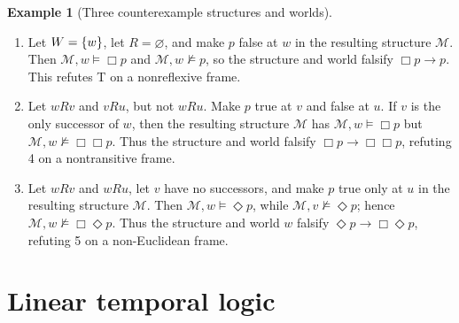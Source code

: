 \documentclass[11pt,oneside,openany]{book}
\theoremstyle{definition}
\newtheorem{example}[definition]{Example}
\theoremstyle{plain}
\theoremstyle{remark}
\DeclarePairedDelimiter{\set}{\lbrace}{\rbrace}
\newcommand{\entails}{\models}
\newcommand{\notentails}{\not\models}
\begin{document}
\begin{example}[Three counterexample structures and worlds]
\begin{enumerate}
  \item Let \(W=\set w\), let \(R=\varnothing\), and make \(p\) false at
        \(w\) in the resulting structure \(\mathcal M\).  Then
        \(\mathcal M,w\entails\Box p\) and
        \(\mathcal M,w\notentails p\), so the structure and world falsify
        \(\Box p\to p\).  This refutes T on a nonreflexive frame.
  \item Let \(wRv\) and \(vRu\), but not \(wRu\).  Make \(p\) true at \(v\)
        and false at \(u\).  If \(v\) is the only successor of \(w\), then
        the resulting structure \(\mathcal M\) has
        \(\mathcal M,w\entails\Box p\) but
        \(\mathcal M,w\notentails\Box\Box p\).  Thus the structure and world
        falsify \(\Box p\to\Box\Box p\), refuting 4 on a nontransitive frame.
  \item Let \(wRv\) and \(wRu\), let \(v\) have no successors, and make \(p\)
        true only at \(u\) in the resulting structure \(\mathcal M\).  Then
        \(\mathcal M,w\entails\Diamond p\), while
        \(\mathcal M,v\notentails\Diamond p\); hence
        \(\mathcal M,w\notentails\Box\Diamond p\).  Thus the structure and
        world \(w\) falsify
        \(\Diamond p\to\Box\Diamond p\), refuting 5 on a non-Euclidean frame.
\end{enumerate}
\end{example}

\section{Linear temporal logic}
\label{sec:modal-temporal-epistemic-02}
\end{document}
